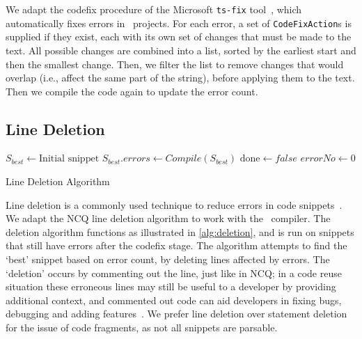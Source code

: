 \documentclass[conference]{IEEEtran}
\begin{document}
We adapt the codefix procedure of the Microsoft \texttt{ts-fix} tool~\cite{tsfix}, which automatically fixes errors in \ts\ projects. For each error, a set of \texttt{CodeFixAction}s is supplied if they exist, each with its own set of changes that must be made to the text. All possible changes are combined into a list, sorted by the earliest start and then the smallest change. Then, we filter the list to remove changes that would overlap (i.e., affect the same part of the string), before applying them to the text. Then we compile the code again to update the error count. 

\subsection{Line Deletion}

\DontPrintSemicolon
\begin{algorithm}
    $S_{best} \gets \text{Initial snippet}$\;
    $S_{best}\text{.}errors \gets  Compile(S_{best})$\;
    $\text{done} \gets false$\;
    $\text{$errorNo$} \gets 0$\;
    \;
\caption{Line Deletion Algorithm}
\label{alg:deletion}
\end{algorithm}

Line deletion is a commonly used technique to reduce errors in code snippets~\cite{legoues2012operators,harrand2019neutralvariants,10.1145/3520304.3533970,10.1145/3520304.3528772, petke2019survey, ginelli2022deletions, reidNCQ}. We adapt the NCQ line deletion algorithm to work with the \ts\ compiler. The deletion algorithm functions as illustrated in \autoref{alg:deletion}, and is run on snippets that still have errors after the codefix stage. The algorithm attempts to find the `best' snippet based on error count, by deleting lines affected by errors. The `deletion' occurs by commenting out the line, just like in NCQ; in a code reuse situation these erroneous lines may still be useful to a developer by providing additional context, and commented out code can aid developers in fixing bugs, debugging and adding features~\cite{pham2020secret}. 
We prefer line deletion over statement deletion for the issue of code fragments, as not all snippets are parsable.
\end{document}
